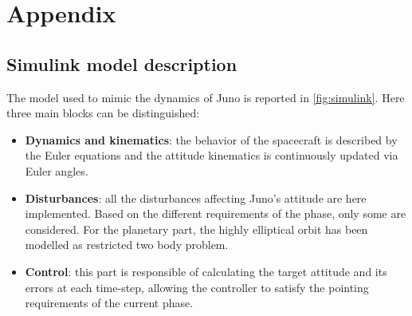 \section{Appendix}
\label{sec:appendix_4}

\subsection{Simulink model description}
\label{subsec:simulink}


The model used to mimic the dynamics of Juno is reported in \autoref{fig:simulink}. Here three main blocks can be distinguished:

\begin{itemize}
    \item \textbf{Dynamics and kinematics}: the behavior of the spacecraft is described by the Euler equations and the attitude kinematics is continuously updated via Euler angles. 
    \item \textbf{Disturbances}: all the disturbances affecting Juno's attitude are here implemented. Based on the different requirements of the phase, only some are considered. For the planetary part, the highly elliptical orbit has been modelled as restricted two body problem. 
    \item \textbf{Control}: this part is responsible of calculating the target attitude and its errors at each time-step, allowing the controller to satisfy the pointing requirements of the current phase.
\end{itemize}